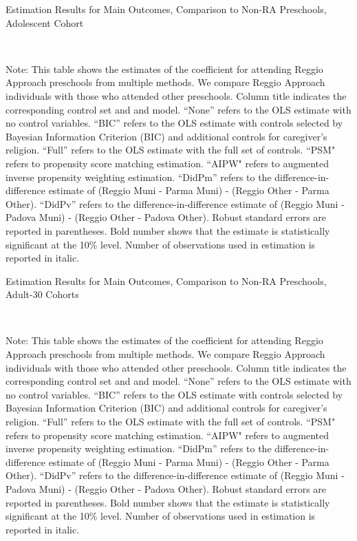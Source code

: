 \begin{table}[H] \caption{Estimation Results for Main Outcomes, Comparison to Non-RA Preschools, Adolescent Cohort} \label{ols-M-adol-reg-pres}
\scalebox{0.7}{}
\vspace{1ex} \\
\footnotesize\raggedright{Note: This table shows the estimates of the coefficient for attending Reggio Approach preschools from multiple methods. We compare Reggio Approach individuals with those who attended other preschools. Column title indicates the corresponding control set and and model. ``None'' refers to the OLS estimate with no control variables. ``BIC'' refers to the OLS estimate with controls selected by Bayesian Information Criterion (BIC) and additional controls for caregiver's religion. ``Full'' refers to the OLS estimate with the full set of controls. ``PSM" refers to propensity score matching estimation. ``AIPW" refers to augmented inverse propensity weighting estimation. ``DidPm'' refers to the difference-in-difference estimate of (Reggio Muni - Parma Muni) - (Reggio Other - Parma Other). ``DidPv'' refers to the difference-in-difference estimate of (Reggio Muni - Padova Muni) - (Reggio Other - Padova Other). Robust standard errors are reported in parentheses. Bold number shows that the estimate is statistically significant at the 10\% level. Number of observations used in estimation is reported in italic.}
\end{table}




\begin{table}[H] \caption{Estimation Results for Main Outcomes, Comparison to Non-RA Preschools, Adult-30 Cohorts} \label{ols-M-adult30-reg-pres}
\scalebox{0.65}{}
\vspace{1ex} \\
\footnotesize\raggedright{Note: This table shows the estimates of the coefficient for attending Reggio Approach preschools from multiple methods. We compare Reggio Approach individuals with those who attended other preschools. Column title indicates the corresponding control set and and model. ``None'' refers to the OLS estimate with no control variables. ``BIC'' refers to the OLS estimate with controls selected by Bayesian Information Criterion (BIC) and additional controls for caregiver's religion. ``Full'' refers to the OLS estimate with the full set of controls. ``PSM" refers to propensity score matching estimation. ``AIPW" refers to augmented inverse propensity weighting estimation. ``DidPm'' refers to the difference-in-difference estimate of (Reggio Muni - Parma Muni) - (Reggio Other - Parma Other). ``DidPv'' refers to the difference-in-difference estimate of (Reggio Muni - Padova Muni) - (Reggio Other - Padova Other). Robust standard errors are reported in parentheses. Bold number shows that the estimate is statistically significant at the 10\% level. Number of observations used in estimation is reported in italic.}
\end{table}

